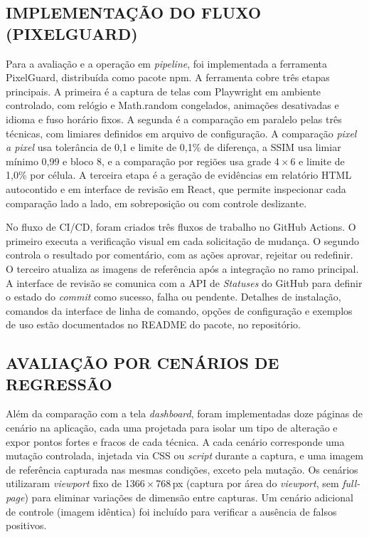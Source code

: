 \documentclass{UNESC}
\begin{document}
\subsection{IMPLEMENTAÇÃO DO FLUXO (PIXELGUARD)}
Para a avaliação e a operação em \emph{pipeline}, foi implementada a ferramenta PixelGuard, distribuída como pacote npm. A ferramenta cobre três etapas principais. A primeira é a captura de telas com Playwright em ambiente controlado, com relógio e Math.random congelados, animações desativadas e idioma e fuso horário fixos. A segunda é a comparação em paralelo pelas três técnicas, com limiares definidos em arquivo de configuração. A comparação \emph{pixel a pixel} usa tolerância de 0,1 e limite de 0,1\% de diferença, a SSIM usa limiar mínimo 0,99 e bloco 8, e a comparação por regiões usa grade 4\,$\times$\,6 e limite de 1,0\% por célula. A terceira etapa é a geração de evidências em relatório HTML autocontido e em interface de revisão em React, que permite inspecionar cada comparação lado a lado, em sobreposição ou com controle deslizante.

No fluxo de CI/CD, foram criados três fluxos de trabalho no GitHub Actions. O primeiro executa a verificação visual em cada solicitação de mudança. O segundo controla o resultado por comentário, com as ações aprovar, rejeitar ou redefinir. O terceiro atualiza as imagens de referência após a integração no ramo principal. A interface de revisão se comunica com a API de \emph{Statuses} do GitHub para definir o estado do \emph{commit} como sucesso, falha ou pendente. Detalhes de instalação, comandos da interface de linha de comando, opções de configuração e exemplos de uso estão documentados no README do pacote, no repositório.


\subsection{AVALIAÇÃO POR CENÁRIOS DE REGRESSÃO}
Além da comparação com a tela \textit{dashboard}, foram implementadas doze páginas de cenário na aplicação, cada uma projetada para isolar um tipo de alteração e expor pontos fortes e fracos de cada técnica. A cada cenário corresponde uma mutação controlada, injetada via CSS ou \emph{script} durante a captura, e uma imagem de referência capturada nas mesmas condições, exceto pela mutação. Os cenários utilizaram \emph{viewport} fixo de 1366\,$\times$\,768\,px (captura por área do \emph{viewport}, sem \emph{full-page}) para eliminar variações de dimensão entre capturas. Um cenário adicional de controle (imagem idêntica) foi incluído para verificar a ausência de falsos positivos.
\end{document}
